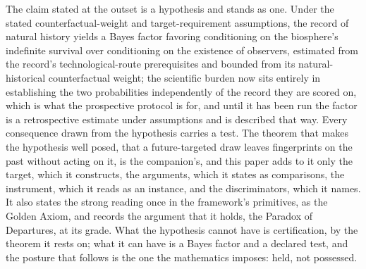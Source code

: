 The claim stated at the outset is a hypothesis and stands as one. Under
the stated counterfactual-weight and target-requirement assumptions, the
record of natural history yields a Bayes factor favoring conditioning on
the biosphere's indefinite survival over conditioning on the existence
of observers, estimated from the record's technological-route
prerequisites and bounded from its natural-historical counterfactual
weight; the scientific burden now sits entirely in establishing the two
probabilities independently of the record they are scored on, which is
what the prospective protocol is for, and until it has been run the
factor is a retrospective estimate under assumptions and is described
that way. Every consequence drawn from the hypothesis carries a test. The theorem that makes the hypothesis well posed, that a
future-targeted draw leaves fingerprints on the past without acting on
it, is the companion's, and this paper adds to it only the target, which
it constructs, the arguments, which it states as comparisons, the
instrument, which it reads as an instance, and the discriminators, which
it names. It also states the strong reading once in the framework's
primitives, as the Golden Axiom, and records the argument that
it holds, the Paradox of Departures, at its grade. What the hypothesis cannot have is certification, by the
theorem it rests on; what it can have is a Bayes factor and a declared
test, and the posture that follows is the one the mathematics imposes:
held, not possessed.

\printbibliography
